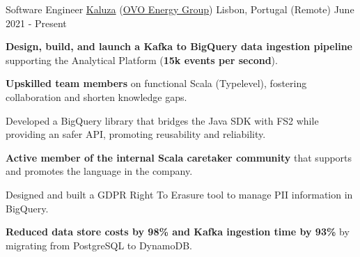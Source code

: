 
\begin{cventries}
  \vspace{-2mm}
  \cventry
    {Software Engineer}
    {\href{https://www.kaluza.com/}{Kaluza} (\href{https://www.ovoenergy.com/}{OVO Energy Group})}
    {Lisbon, Portugal (Remote)}
    {June 2021 - Present}
    {
      \begin{cvitems}
        \item \textbf{Design, build, and launch a Kafka to BigQuery data ingestion pipeline} supporting the Analytical Platform (\textbf{15k events per second}).
        \item \textbf{Upskilled team members} on functional Scala (Typelevel), fostering collaboration and shorten knowledge gaps.
        \item Developed a BigQuery library that bridges the Java SDK with FS2 while providing an safer API, promoting reusability and reliability.
        \item \textbf{Active member of the internal Scala caretaker community} that supports and promotes the language in the company.
        \item Designed and built a GDPR Right To Erasure tool to manage PII information in BigQuery.
        \item \textbf{Reduced data store costs by 98\% and Kafka ingestion time by 93\%} by migrating from PostgreSQL to DynamoDB.
      \end{cvitems}
      \vspace{4mm}
    }



\end{cventries}
